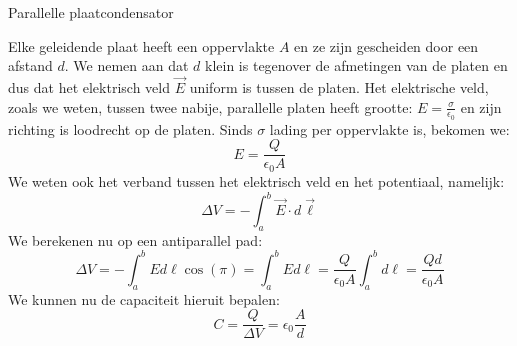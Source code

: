 \begin{app}{Parallelle plaatcondensator}

    \begin{minipage}{.76\textwidth} 
        Elke geleidende plaat heeft een oppervlakte $A$ en ze zijn gescheiden door een afstand $d$. We nemen aan dat $d$ klein is tegenover de afmetingen van de platen en dus dat het elektrisch veld $\Vec{E}$ uniform is tussen de platen.
        Het elektrische veld, zoals we weten, tussen twee nabije, parallelle platen heeft grootte: $E = \tfrac{\sigma}{\epsilon_0}$ en zijn richting is loodrecht op de platen.
        Sinds $\sigma$ lading per oppervlakte is, bekomen we:
        \begin{equation*}
            E = \dfrac{Q}{\epsilon_0A}
        \end{equation*}
        We weten ook het verband tussen het elektrisch veld en het potentiaal, namelijk:
        \begin{equation*}
            \Delta V = - \int_{a}^{b} \Vec{E} \cdot d\Vec{\ell}
        \end{equation*}
        We berekenen nu op een antiparallel pad:
        \begin{equation*}
             \Delta V = - \int_{a}^{b} Ed\ell\cos(\pi) = \int_{a}^{b} Ed\ell = \dfrac{Q}{\epsilon_0A}\int_{a}^{b}d\ell = \dfrac{Qd}{\epsilon_0A}
        \end{equation*}
        We kunnen nu de capaciteit hieruit bepalen:
        \begin{equation*}
            C = \dfrac{Q}{\Delta V} = \epsilon_0\dfrac{A}{d}
        \end{equation*}
    \end{minipage}
    \begin{minipage}{.2\textwidth}

\end{minipage}
\end{app}
